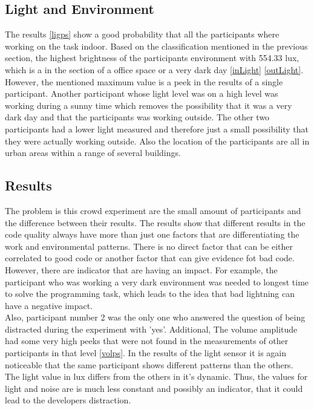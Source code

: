 \subsection{Light and Environment}
The results \ref{ligps} show a good probability that all the participants where working on the task indoor. Based on the classification mentioned in the previous section, the highest brightness of the participants environment with 554.33 lux, which is a in the section of a office space or a very dark day \ref{inLight} \ref{outLight}. However, the mentioned maximum value is a peek in the results of a single participant. Another participant whose light level was on a high level was working during a sunny time which removes the possibility that it was a very dark day and that the participants was working outside. 
The other two participants had a lower light measured and therefore just a small possibility that they were actually working outside.  
Also the location of the participants are all in urban areas within a range of several buildings. 

\subsection{Results}
The problem is this crowd experiment are the small amount of participants and the difference between their results. The results show that different results in the code quality always have more than just one factors that are differentiating the work and environmental patterns. There is no direct factor that can be either correlated to good code or another factor that can give evidence fot bad code. However, there are indicator that are having an impact. For example, the participant who was working a very dark environment was needed to longest time to solve the programming task, which leads to the idea that bad lightning can have a negative impact.\\ 
Also, participant number 2 was the only one who answered the question of being distracted during the experiment with 'yes'. Additional, The volume amplitude had some very high peeks that were not found in the measurements of other participants in that level \ref{volps}. In the results of the light sensor it is again noticeable that the same participant shows different patterns than the others. The light value in lux differs from the others in it's dynamic. Thus, the values for light and noise are is much less constant and possibly an indicator, that it could lead to the developers distraction.\\


